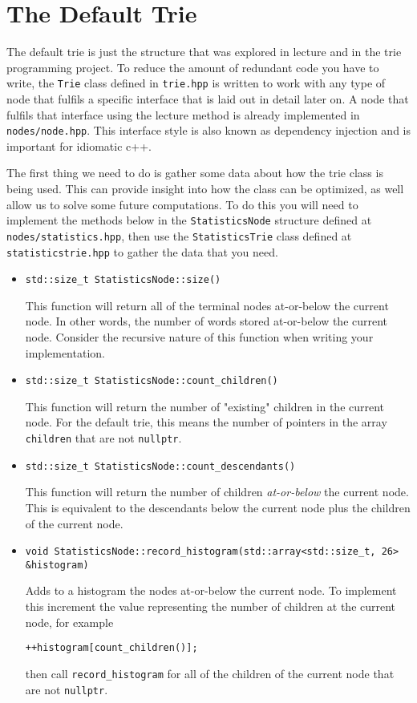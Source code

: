 \documentclass{article}
\begin{document}
\section{The Default Trie}

The default trie is just the structure that was explored in lecture and in the trie programming project. To reduce the amount of redundant code you have to write, the \verb|Trie| class defined in \verb|trie.hpp| is written to work with any type of node that fulfils a specific interface that is laid out in detail later on. A node that fulfils that interface using the lecture method is already implemented in \verb|nodes/node.hpp|. This interface style is also known as dependency injection and is important for idiomatic c++.

The first thing we need to do is gather some data about how the trie class is being used. This can provide insight into how the class can be optimized, as well allow us to solve some future computations. To do this you will need to implement the methods below in the \verb|StatisticsNode| structure defined at \verb|nodes/statistics.hpp|, then use the \verb|StatisticsTrie| class defined at \\ \verb|statisticstrie.hpp| to gather the data that you need.

\begin{itemize}
    \item \verb|std::size_t StatisticsNode::size()|

    This function will return all of the terminal nodes at-or-below the current node. In other words, the number of words stored at-or-below the current node. Consider the recursive nature of this function when writing your implementation.

    \item \verb|std::size_t StatisticsNode::count_children()|

    This function will return the number of "existing" children in the current node. For the default trie, this means the number of pointers in the array \verb|children| that are not \verb|nullptr|.

    \item \verb|std::size_t StatisticsNode::count_descendants()|

    This function will return the number of children \textit{at-or-below} the current node. This is equivalent to the descendants below the current node plus the children of the current node.

    \item \verb|void StatisticsNode::record_histogram(std::array<std::size_t, 26> &histogram)|

    Adds to a histogram the nodes at-or-below the current node. To implement this increment the value representing the number of children at the current node, for example
    
    \verb|++histogram[count_children()];|
    
    then call \verb|record_histogram| for all of the children of the current node that are not \verb|nullptr|.
\end{itemize}
\end{document}
